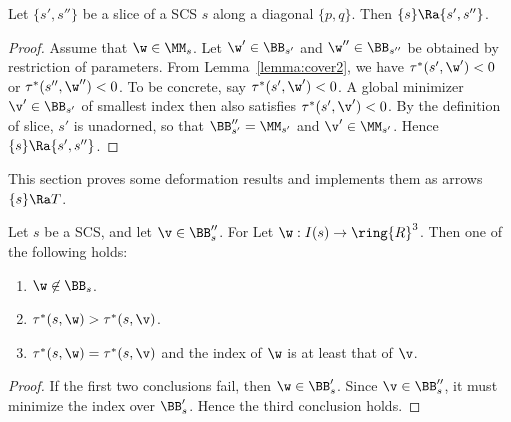 \begin{lemma}[slice]  
Let $\{s',s''\}$ be a slice of
a SCS $s$ along
a diagonal $\{p,q\}$.  
Then   $\{s\}\Ra\{s',s''\}$.
\end{lemma}

\begin{proof}
Assume that $\w\in\MM_s$.
Let $\w'\in \BB_{s'}$ and $\w''\in \BB_{s''}$ be obtained
by restriction of parameters.  From Lemma~\ref{lemma:cover2},
we have $\tau^*(s',\w')< 0$ or $\tau^*(s'',\w'')<0$.  To be
concrete, say $\tau^*(s',\w')< 0$.  A global minimizer $\v'\in\BB_{s'}$ of smallest index
then also satisfies $\tau^*(s',\v')< 0$.  By the definition of
slice, $s'$ is unadorned, so that $\BB''_{s'}=\MM_{s'}$ and
$\v'\in \MM_{s'}$.  Hence $\{s\}\Ra\{s',s''\}$.
\end{proof}



This section proves some deformation results and implements them
as arrows $\{s\}\Ra T$.

\begin{lemma} 
Let $s$ be a SCS, and let $\v\in\BB''_s$.  For
Let $\w:I(s)\to\ring{R}^3$.
Then  one of the following holds:
\begin{enumerate}
\item $\w\not\in \BB_s$.
\item $\tau^*(s,\w)> \tau^*(s,\v)$.
\item $\tau^*(s,\w)=\tau^*(s,\v)$ and the index of $\w$ is at least that of $\v$.
\end{enumerate}
\end{lemma}

\begin{proof}
If the first two conclusions fail, then $\w\in \BB'_s$.  Since $\v\in\BB''_s$,
it must minimize the index over $\BB'_s$.  Hence the third conclusion holds.
\end{proof}


